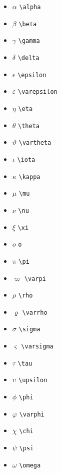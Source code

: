 \documentclass[twocolumn]{book}        %
\begin{document}
\begin{itemize}
    \item $\alpha$ \texttt{\textbackslash alpha}
    \item $\beta$ \texttt{\textbackslash beta}
    \item $\gamma$ \texttt{\textbackslash gamma}
    \item $\delta$ \texttt{\textbackslash delta}
    \item $\epsilon$ \texttt{\textbackslash epsilon}
    \item $\varepsilon$ \texttt{\textbackslash varepsilon}
    \item $\eta$ \texttt{\textbackslash eta}
    \item $\theta$ \texttt{\textbackslash theta}
    \item $\vartheta$ \texttt{\textbackslash vartheta}
    \item $\iota$ \texttt{\textbackslash iota}
    \item $\kappa$ \texttt{\textbackslash kappa}
    \item $\mu$ \texttt{\textbackslash mu}
    \item $\nu$ \texttt{\textbackslash nu}
    \item $\xi$ \texttt{\textbackslash xi}
    \item $o$ \texttt{o}
    \item $\pi$ \texttt{\textbackslash pi}
    \item $\varpi$ \texttt{\textbackslash varpi}
    \item $\rho$ \texttt{\textbackslash rho}
    \item $\varrho$ \texttt{\textbackslash varrho}
    \item $\sigma$ \texttt{\textbackslash sigma}
    \item $\varsigma$ \texttt{\textbackslash varsigma}
    \item $\tau$ \texttt{\textbackslash tau}
    \item $\upsilon$ \texttt{\textbackslash upsilon}
    \item $\phi$ \texttt{\textbackslash phi}
    \item $\varphi$ \texttt{\textbackslash varphi}
    \item $\chi$ \texttt{\textbackslash chi}
    \item $\psi$ \texttt{\textbackslash psi}
    \item $\omega$ \texttt{\textbackslash omega}
\end{itemize}
\end{document}
